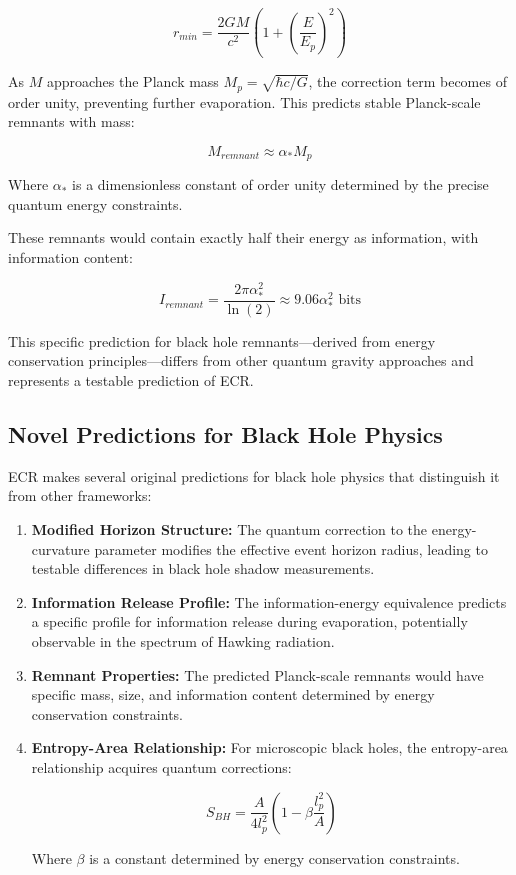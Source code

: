 \documentclass[11pt,a4paper]{article}
\begin{document}
\begin{equation}
    r_{min} = \frac{2GM}{c^2}\left(1 + \left(\frac{E}{E_p}\right)^2\right)
\end{equation}

As $M$ approaches the Planck mass $M_p = \sqrt{\hbar c/G}$, the correction term becomes of order unity, preventing further evaporation. This predicts stable Planck-scale remnants with mass:

\begin{equation}
    M_{remnant} \approx \alpha_* M_p
\end{equation}

Where $\alpha_*$ is a dimensionless constant of order unity determined by the precise quantum energy constraints.

These remnants would contain exactly half their energy as information, with information content:

\begin{equation}
    I_{remnant} = \frac{2\pi\alpha_*^2}{\ln(2)} \approx 9.06\alpha_*^2 \text{ bits}
\end{equation}

This specific prediction for black hole remnants—derived from energy conservation principles—differs from other quantum gravity approaches and represents a testable prediction of ECR.

\subsection{Novel Predictions for Black Hole Physics}

ECR makes several original predictions for black hole physics that distinguish it from other frameworks:

\begin{enumerate}
    \item \textbf{Modified Horizon Structure:} The quantum correction to the energy-curvature parameter modifies the effective event horizon radius, leading to testable differences in black hole shadow measurements.
    
    \item \textbf{Information Release Profile:} The information-energy equivalence predicts a specific profile for information release during evaporation, potentially observable in the spectrum of Hawking radiation.
    
    \item \textbf{Remnant Properties:} The predicted Planck-scale remnants would have specific mass, size, and information content determined by energy conservation constraints.
    
    \item \textbf{Entropy-Area Relationship:} For microscopic black holes, the entropy-area relationship acquires quantum corrections:
    
    \begin{equation}
        S_{BH} = \frac{A}{4l_p^2}\left(1 - \beta\frac{l_p^2}{A}\right)
    \end{equation}
    
    Where $\beta$ is a constant determined by energy conservation constraints.
\end{enumerate}
\end{document}
